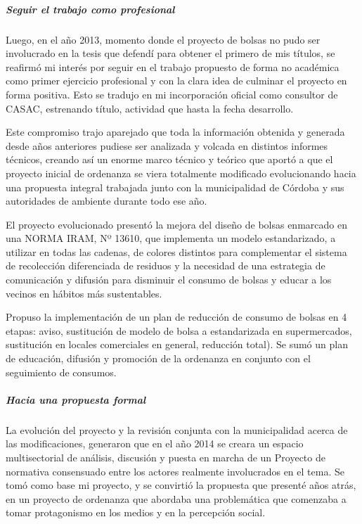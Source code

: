 \documentclass[
]{article}
\begin{document}
\hypertarget{seguir-el-trabajo-como-profesional}{%
\subparagraph{\texorpdfstring{\textbf{Seguir el trabajo como
profesional}}{Seguir el trabajo como profesional}}\label{seguir-el-trabajo-como-profesional}}

Luego, en el año 2013, momento donde el proyecto de bolsas no pudo ser
involucrado en la tesis que defendí para obtener el primero de mis
títulos, se reafirmó mi interés por seguir en el trabajo propuesto de
forma no académica como primer ejercicio profesional y con la clara idea
de culminar el proyecto en forma positiva. Esto se tradujo en mi
incorporación oficial como consultor de CASAC, estrenando título,
actividad que hasta la fecha desarrollo.

Este compromiso trajo aparejado que toda la información obtenida y
generada desde años anteriores pudiese ser analizada y volcada en
distintos informes técnicos, creando así un enorme marco técnico y
teórico que aportó a que el proyecto inicial de ordenanza se viera
totalmente modificado evolucionando hacia una propuesta integral
trabajada junto con la municipalidad de Córdoba y sus autoridades de
ambiente durante todo ese año.

El proyecto evolucionado presentó la mejora del diseño de bolsas
enmarcado en una NORMA IRAM, Nº 13610, que implementa un modelo
estandarizado, a utilizar en todas las cadenas, de colores distintos
para complementar el sistema de recolección diferenciada de residuos y
la necesidad de una estrategia de comunicación y difusión para disminuir
el consumo de bolsas y educar a los vecinos en hábitos más sustentables.

Propuso la implementación de un plan de reducción de consumo de bolsas
en 4 etapas: aviso, sustitución de modelo de bolsa a estandarizada en
supermercados, sustitución en locales comerciales en general, reducción
total). Se sumó un plan de educación, difusión y promoción de la
ordenanza en conjunto con el seguimiento de consumos.

\hypertarget{hacia-una-propuesta-formal}{%
\subparagraph{\texorpdfstring{\textbf{Hacia una propuesta
formal}}{Hacia una propuesta formal}}\label{hacia-una-propuesta-formal}}

La evolución del proyecto y la revisión conjunta con la municipalidad
acerca de las modificaciones, generaron que en el año 2014 se creara un
espacio multisectorial de análisis, discusión y puesta en marcha de un
Proyecto de normativa consensuado entre los actores realmente
involucrados en el tema. Se tomó como base mi proyecto, y se convirtió
la propuesta que presenté años atrás, en un proyecto de ordenanza que
abordaba una problemática que comenzaba a tomar protagonismo en los
medios y en la percepción social.
\end{document}
